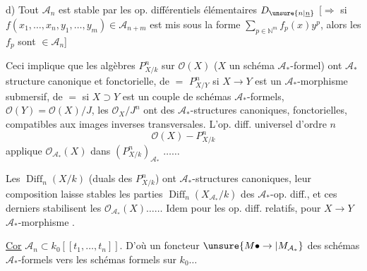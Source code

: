 d) Tout $\mathcal A_n$ est stable par les op. différentiels élémentaires $D_{\unsure{n|\underline n}}$ [$\Longrightarrow$ si $f(x_1,\ldots,x_n,y_1,\ldots,y_m)\in \mathcal A_{n+m}$ est mis sous la forme $\sum_{p\in\mathbb N^m}f_p(x)y^p$, alors les $f_p$ sont $\in \mathcal A_n$]

Ceci implique que les algèbres $P^n_{X/k}$ sur $\mathcal O(X)$ ($X$ un  schéma $\mathcal A_*$-formel) ont  $\mathcal A_*$ structure canonique et fonctorielle, de $=$ $P^n_{X/Y}$ si $X\to Y$ est un $\mathcal A_*$-morphisme submersif, de $=$  si $X\supset Y$ est un couple de schémas $\mathcal A_*$-formels, $\mathcal O(Y)=\mathcal O(X)/J$, les  $\mathcal O_X/J^n$ ont des $\mathcal A_*$-structures canoniques, fonctorielles, compatibles aux images inverses transversales. L'op. diff. universel d'ordre $n$
\[
\mathcal O(X)\mathbin{-}P^n_{X/k}
\]
 applique $\mathcal O_{\mathcal A_*}(X)$ dans $(P^n_{X/k})_{\mathcal A_*}$  $\ldots\ldots$

 Les $\operatorname{Diff}_n(X/k)$ (duals des $P^n_{X/k}$) ont  $\mathcal A_*$-structures canoniques, leur composition  laisse stables les parties $\operatorname{Diff}_n(X_{\mathcal A_*}/k)$ des $\mathcal A_*$-op. diff., et ces derniers stabilisent les  $\mathcal O_{\mathcal A_*}(X)\ldots\ldots$ Idem pour les op. diff. relatifs, pour $X\to Y$ $\mathcal A_*$-morphisme  .

\uline{Cor} $\mathcal A_n\subset k_0[[t_1,\ldots,t_n]]$.  D'où un foncteur $\unsure{M\mathbin{\bullet}\to|M_{\mathcal A_*}}$ des schémas $\mathcal A_*$-formels vers les schémas formels sur $k_0\ldots$

